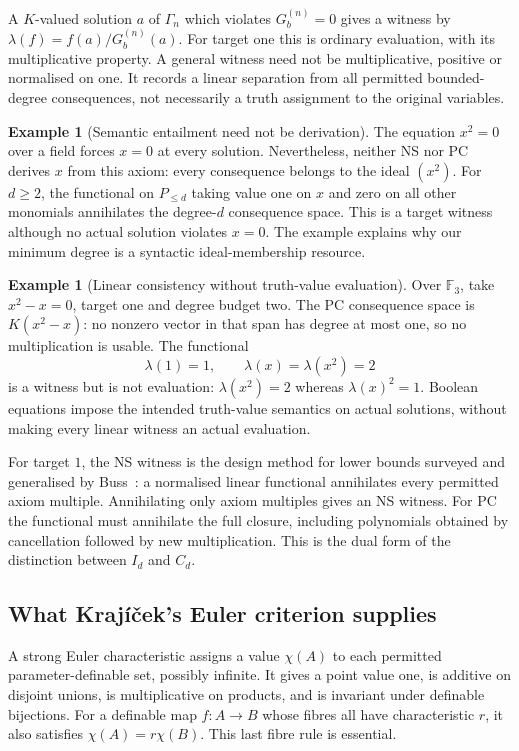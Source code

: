 \documentclass[11pt,a4paper]{article}
\theoremstyle{definition}\newtheorem{definition}[theorem]{Definition}
\newtheorem{example}[theorem]{Example}
\theoremstyle{remark}\newtheorem{remark}[theorem]{Remark}
\begin{document}
A $K$-valued solution $a$ of $\Gamma_n$ which violates $G_b^{(n)}=0$ gives a
witness by $\lambda(f)=f(a)/G_b^{(n)}(a)$. For target one this is ordinary
evaluation, with its multiplicative property. A general witness need
not be multiplicative, positive or normalised on one. It records a
linear separation from all permitted bounded-degree consequences,
not necessarily a truth assignment to the original variables.

\begin{example}[Semantic entailment need not be derivation]
The equation $x^2=0$ over a field forces $x=0$ at every solution.
Nevertheless, neither NS nor PC derives $x$ from this axiom: every
consequence belongs to the ideal $(x^2)$. For $d\ge2$, the functional
on $P_{\le d}$ taking value one on $x$ and zero on all other monomials
annihilates the degree-$d$ consequence space. This is a target witness
although no actual solution violates $x=0$. The example explains why
our minimum degree is a syntactic ideal-membership resource.
\end{example}

\begin{example}[Linear consistency without truth-value evaluation]
Over $\mathbb F_3$, take $x^2-x=0$, target one and degree budget two.
The PC consequence space is $K(x^2-x)$: no nonzero vector in that span
has degree at most one, so no multiplication is usable. The functional
\[
 \lambda(1)=1,\qquad\lambda(x)=\lambda(x^2)=2
\]
is a witness but is not evaluation: $\lambda(x^2)=2$ whereas
$\lambda(x)^2=1$. Boolean equations impose the intended truth-value
semantics on actual solutions, without making every linear witness an
actual evaluation.
\end{example}

For target $1$, the NS witness is the design method for lower bounds
surveyed and generalised by Buss~\cite{BussDesign}: a normalised
linear functional annihilates every permitted axiom multiple.
Annihilating only axiom multiples gives an NS witness. For PC the
functional must annihilate the full closure, including polynomials
obtained by cancellation followed by new multiplication. This is the
dual form of the distinction between $I_d$ and $C_d$.

\subsection{What Kraj\'i\v cek's Euler criterion supplies}
A strong Euler characteristic assigns a value $\chi(A)$ to each
permitted parameter-definable set, possibly infinite. It gives a point
value one, is additive on disjoint unions, is multiplicative on products,
and is invariant under definable bijections. For a definable map
$f:A\to B$ whose fibres all have characteristic $r$, it also satisfies
$\chi(A)=r\chi(B)$. This last fibre rule is essential.
\end{document}
